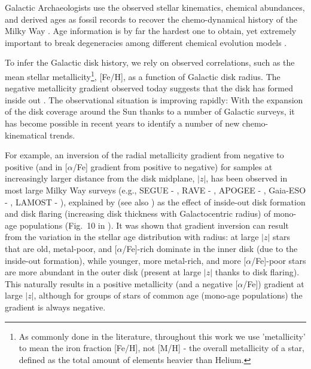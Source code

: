 \documentclass[usenatbib]{mnras}
\begin{document}
Galactic Archaeologists use the observed stellar kinematics, chemical abundances, and derived ages as fossil records to recover the chemo-dynamical history of the Milky Way \citep{freeman02, bland-hawthorn10, rix13, binney13, minchev16a, hogg16}. Age information is by far the hardest one to obtain, yet extremely important to break degeneracies among different chemical evolution models \citep{miglio17}.

To infer the Galactic disk history, we rely on observed correlations, such as  the mean stellar metallicity\footnote{As commonly done in the literature, throughout this work we use 'metallicity' to mean the iron fraction [Fe/H], not [M/H] - the overall metallicity of a star, defined as the total amount of elements heavier than Helium.}, [Fe/H], as a function of Galactic disk radius. The negative metallicity gradient observed today suggests that the disk has formed inside out \citep{matteucci89}. The observational situation is improving rapidly: With the expansion of the disk coverage around the Sun thanks to a number of Galactic surveys, it has become possible in recent years to identify a number of new chemo-kinematical trends. 

For example, an inversion of the radial metallicity gradient from negative to positive (and in [$\alpha$/Fe] gradient from positive to negative) for samples at increasingly larger distance from the disk midplane, $|z|$, has been observed in most large Milky Way surveys (e.g., SEGUE - \citealt{cheng12a}, RAVE - \citealt{boeche13b}, APOGEE - \citealt{anders14}, Gaia-ESO - \citealt{recio-blanco14}, LAMOST - \citealt{wang19}), explained by \cite{mcm14} (see also \citealt{rahimi14, miranda16, ma17, schonrich17}) as the effect of inside-out disk formation and disk flaring (increasing disk thickness with Galactocentric radius) of mono-age populations (Fig.~10 in \citealt{mcm14}). It was shown that gradient inversion can result from the variation in the stellar age distribution with radius: at large $|z|$ stars that are old, metal-poor, and  [$\alpha$/Fe]-rich dominate in the inner disk (due to the inside-out formation), while younger, more metal-rich, and more [$\alpha$/Fe]-poor stars are more abundant in the outer disk (present at large $|z|$ thanks to disk flaring). This naturally results in a positive metallicity (and a negative [$\alpha$/Fe]) gradient at large $|z|$, although for groups of stars of common age (mono-age populations) the gradient is always negative.
\end{document}
